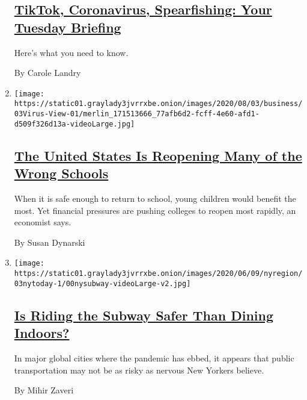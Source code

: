\begin{enumerate}
  \hypertarget{tiktok-coronavirus-spearfishing-your-tuesday-briefing}{%
  \subsection{\texorpdfstring{\href{/2020/08/03/briefing/coronavirus-tiktok-afghanistan-australia.html}{TikTok,
  Coronavirus, Spearfishing: Your Tuesday
  Briefing}}{TikTok, Coronavirus, Spearfishing: Your Tuesday Briefing}}\label{tiktok-coronavirus-spearfishing-your-tuesday-briefing}}

  Here's what you need to know.

  By Carole Landry
\item
  \texttt{[image: https://static01.graylady3jvrrxbe.onion/images/2020/08/03/business/03Virus-View-01/merlin\_171513666\_77afb6d2-fcff-4e60-afd1-d509f326d13a-videoLarge.jpg]}

  \hypertarget{the-united-states-is-reopening-many-of-the-wrong-schools}{%
  \subsection{\texorpdfstring{\href{/2020/08/03/business/how-schools-reopen.html}{The
  United States Is Reopening Many of the Wrong
  Schools}}{The United States Is Reopening Many of the Wrong Schools}}\label{the-united-states-is-reopening-many-of-the-wrong-schools}}

  When it is safe enough to return to school, young children would
  benefit the most. Yet financial pressures are pushing colleges to
  reopen most rapidly, an economist says.

  By Susan Dynarski
\item
  \texttt{[image: https://static01.graylady3jvrrxbe.onion/images/2020/06/09/nyregion/03nytoday-1/00nysubway-videoLarge-v2.jpg]}

  \hypertarget{is-riding-the-subway-safer-than-dining-indoors}{%
  \subsection{\texorpdfstring{\href{/2020/08/03/nyregion/nyc-subway-coronavirus.html}{Is
  Riding the Subway Safer Than Dining
  Indoors?}}{Is Riding the Subway Safer Than Dining Indoors?}}\label{is-riding-the-subway-safer-than-dining-indoors}}

  In major global cities where the pandemic has ebbed, it appears that
  public transportation may not be as risky as nervous New Yorkers
  believe.

  By Mihir Zaveri
\end{enumerate}

